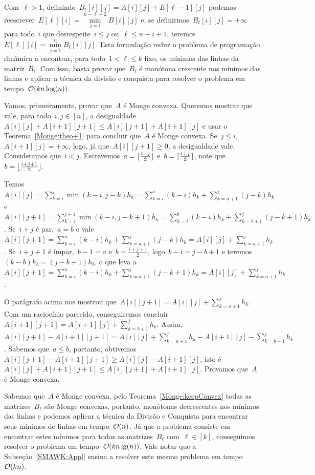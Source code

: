 Com~$\ell > 1$, definindo~$B_\ell[i][j] = A[i][j] + E[\ell-1][j]$ podemos reescrever~$E[\ell][i] = \min \limits_{j=i}^{n-\ell+2} B[i][j]$ e, se definirmos~$B_\ell[i][j] = +\infty$ para todo~$i$ que desrespeite~$i \leq j$ ou~$\ell \leq n - i + 1$, teremos~$E[\ell][i] = \min \limits_{j=1}^{n} B_\ell[i][j]$. Esta formulação reduz o problema de programação dinâmica a encontrar, para todo~$1 < \ell \leq k$ fixo, os mínimos das linhas da matriz~$B_\ell$. Com isso, basta provar que~$B_\ell$ é monótona crescente nos mínimos das linhas e aplicar a técnica da divisão e conquista para resolver o problema em tempo~$\mathcal{O}(kn\log(n))$.

Vamos, primeiramente, provar que~$A$ é Monge convexa. Queremos mostrar que vale, para todo~$i,j \in [n]$, a desigualdade~${A[i][j] + A[i+1][j+1] \leq A[i][j+1] + A[i+1][j]}$ e usar o Teorema~\ref{Monge:theo+1} para concluir que~$A$ é Monge convexa. Se~$j \leq i$, $A[i+1][j] = +\infty$, logo, já que~$A[i][j+1] \geq 0$, a desigualdade vale. Consideramos que~$i < j$. Escrevemos~$a = \lfloor\frac{i+j}{2}\rfloor$ e~$b = \lceil\frac{i+j}{2}\rceil$, note que~$b = \lfloor\frac{i+j+1}{2}\rfloor$.  

Temos~$A[i][j] = \sum\limits_{k=i}^j \min(k-i,j-k)h_k = {\sum\limits_{k=i}^a (k-i) h_k + \sum\limits_{k=a+1}^j (j-k) h_k}$ e~$A[i][j+1] = \sum\limits_{k=i}^{j+1} \min(k-i,j-k+1)h_k = {\sum\limits_{k=i}^b (k-i)h_k + \sum\limits_{k=b+1}^j (j-k+1)h_k}$. Se~$i+j$ é par,~$a=b$ e vale~$A[i][j+1] = {\sum\limits_{k=i}^a (k-i)h_k + \sum\limits_{k=a+1}^j (j-k)h_k} = {A[i][j] + \sum\limits_{k=a+1}^j h_k}$. Se~$i+j+1$ é ímpar,~$b-1=a$ e~$b=\frac{i+j+1}{2}$, logo~$b-i = j-b+1$ e teremos~$(k-b)h_b = (j-b+1)h_b$, o que leva a~$A[i][j+1] = {\sum_{k=i}^a (k-i)h_k + \sum_{k=a+1}^j (j-k+1)h_k} = {A[i][j] + \sum\limits_{k=a+1}^j h_k}$.  

O parágrafo acima nos mostrou que~$A[i][j+1] = {A[i][j] + \sum\limits_{k=a+1}^j h_k}$. Com um raciocínio parecido, conseguiremos concluir~${A[i+1][j+1]} = {A[i+1][j] + \sum\limits_{k=b+1}^j h_k}$. Assim,~$A[i][j+1] - A[i+1][j+1] = A[i][j] + \sum\limits_{k=a+1}^j h_k - A[i+1][j] - \sum\limits_{k=b+1}^j h_k$. Sabemos que~$a \leq b$, portanto, obtivemos~${A[i][j+1] - A[i+1][j+1] \geq A[i][j] - A[i+1][j]}$, isto é~${A[i][j] + A[i+1][j+1] \leq A[i][j+1] + A[i+1][j]}$. Provamos que~$A$ é Monge convexa.

Sabemos que~$A$ é Monge convexa, pelo Teorema~\ref{Monge:keepConvex} todas as matrizes~$B_\ell$ são Monge convexas, portanto, monótonas decrescentes nos mínimos das linhas e podemos aplicar a técnica da Divisão e Conquista para encontrar seus mínimos de linhas em tempo~$\mathcal{O}(n)$. Já que o problema consiste em encontrar estes mínimos para todas as matrizes~$B_\ell$ com~$\ell \in [k]$, conseguimos resolver o problema em tempo~$\mathcal{O}(kn\lg(n))$. Vale notar que a Subseção~\ref{SMAWK:Appl} ensina a resolver este mesmo problema em tempo~$\mathcal{O}(kn)$.
